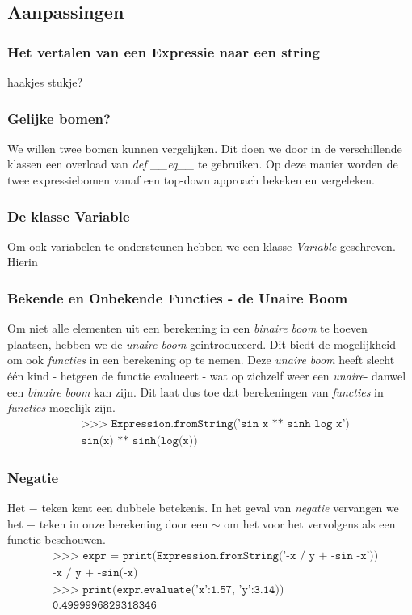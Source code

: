 \documentclass[12pt]{article}
\begin{document}
\subsection{Aanpassingen}

\subsubsection*{Het vertalen van een Expressie naar een string}
haakjes stukje?

\subsubsection*{Gelijke bomen?}
We willen twee bomen kunnen vergelijken. Dit doen we door in de verschillende klassen een overload van \textit{def \_\_eq\_\_} te gebruiken. Op deze manier worden de twee expressiebomen vanaf een top-down approach bekeken en vergeleken.

\subsubsection*{De klasse Variable}
Om ook variabelen te ondersteunen hebben we een klasse \textit{Variable} geschreven. Hierin 



\subsubsection*{Bekende en Onbekende Functies - de Unaire Boom}
Om niet alle elementen uit een berekening in een \textit{binaire boom} te hoeven plaatsen, hebben we de \textit{unaire boom} geintroduceerd. Dit biedt de mogelijkheid om ook \textit{functies} in een berekening op te nemen. Deze \textit{unaire boom} heeft slecht \'e\'en kind - hetgeen de functie evalueert - wat op zichzelf weer een \textit{unaire}- danwel een \textit{binaire boom} kan zijn. Dit laat dus toe dat berekeningen van \textit{functies} in \textit{functies} mogelijk zijn.
\begin{align*}
&\texttt{>>> Expression.fromString('sin x ** sinh log x')}\\
&\texttt{sin(x) ** sinh(log(x))}
\end{align*}

\subsubsection*{Negatie}
Het $-$ teken kent een dubbele betekenis. In het geval van \textit{negatie} vervangen we het $-$ teken in onze berekening door een $\sim$ om het voor het vervolgens als een functie beschouwen. 
\begin{align*}
&\texttt{>>> expr =  print(Expression.fromString('-x / y + -sin -x'))}\\
&\texttt{-x / y + -sin(-x)}\\
&\texttt{>>> print(expr.evaluate({'x':1.57, 'y':3.14}))}\\
&\texttt{0.4999996829318346}
\end{align*}
\end{document}
